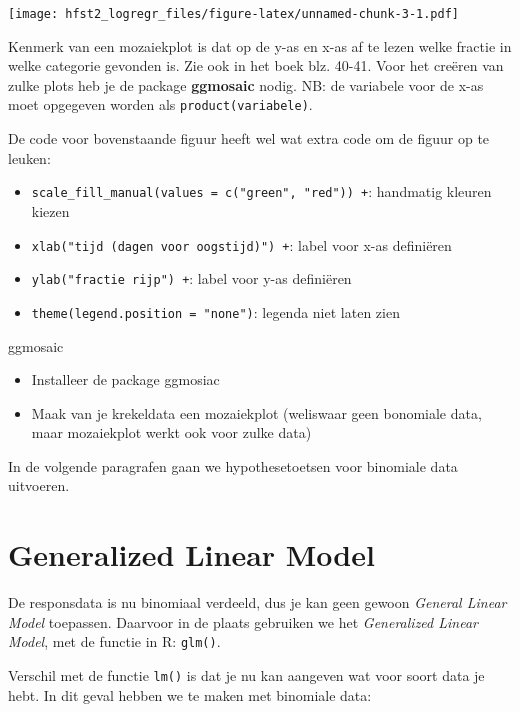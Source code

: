 \documentclass[]{book}
\providecommand{\tightlist}{%
  \setlength{\itemsep}{0pt}\setlength{\parskip}{0pt}}
\theoremstyle{definition}
\theoremstyle{definition}
\theoremstyle{definition}
\theoremstyle{remark}
\let\BeginKnitrBlock\begin \let\EndKnitrBlock\end
\begin{document}
\texttt{[image: hfst2\_logregr\_files/figure-latex/unnamed-chunk-3-1.pdf]}

Kenmerk van een mozaiekplot is dat op de y-as en x-as af te lezen welke
fractie in welke categorie gevonden is. Zie ook in het boek blz. 40-41.
Voor het creëren van zulke plots heb je de package \textbf{ggmosaic}
nodig. NB: de variabele voor de x-as moet opgegeven worden als
\texttt{product(variabele)}.

De code voor bovenstaande figuur heeft wel wat extra code om de figuur
op te leuken:

\begin{itemize}
\tightlist
\item
  \texttt{scale\_fill\_manual(values\ =\ c("green",\ "red"))\ +}:
  handmatig kleuren kiezen
\item
  \texttt{xlab("tijd\ (dagen\ voor\ oogstijd)")\ +}: label voor x-as
  definiëren
\item
  \texttt{ylab("fractie\ rijp")\ +}: label voor y-as definiëren
\item
  \texttt{theme(legend.position\ =\ "none")}: legenda niet laten zien
\end{itemize}

\BeginKnitrBlock{exercise}
\protect\hypertarget{exr:ggmosaic}{}{\label{exr:ggmosaic} }ggmosaic

\begin{itemize}
\tightlist
\item
  Installeer de package ggmosiac
\item
  Maak van je krekeldata een mozaiekplot (weliswaar geen bonomiale data,
  maar mozaiekplot werkt ook voor zulke data)
\end{itemize}
\EndKnitrBlock{exercise}

In de volgende paragrafen gaan we hypothesetoetsen voor binomiale data
uitvoeren.

\section{Generalized Linear Model}\label{generalized-linear-model}

De responsdata is nu binomiaal verdeeld, dus je kan geen gewoon
\emph{General Linear Model} toepassen. Daarvoor in de plaats gebruiken
we het \emph{Generalized Linear Model}, met de functie in R:
\texttt{glm()}.

Verschil met de functie \texttt{lm()} is dat je nu kan aangeven wat voor
soort data je hebt. In dit geval hebben we te maken met binomiale data:
\end{document}
